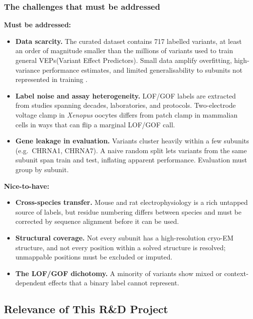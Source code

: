 \documentclass[rnd]{mas_proposal}
\begin{document}
\subsubsection{The challenges that must be addressed}
\textbf{Must be addressed:}
\begin{itemize}
    \item \textbf{Data scarcity.} The curated dataset contains 717 labelled
    variants, at least an order of magnitude smaller than the millions of
    variants used to train general VEPs(Variant Effect Predictors). Small data amplify overfitting,
    high-variance performance estimates, and limited generalisability to
    subunits not represented in training \cite{cadd,alphamissense}.
    \item \textbf{Label noise and assay heterogeneity.} LOF/GOF labels are
    extracted from studies spanning decades, laboratories, and protocols.
    Two-electrode voltage clamp in \emph{Xenopus} oocytes differs from patch
    clamp in mammalian cells in ways that can flip a marginal LOF/GOF call.
    \item \textbf{Gene leakage in evaluation.} Variants cluster heavily within
    a few subunits (e.g.\ CHRNA1, CHRNA7). A naive random split lets variants
    from the same subunit span train and test, inflating apparent performance.
    Evaluation must group by subunit.
\end{itemize}
\textbf{Nice-to-have:}
\begin{itemize}
    \item \textbf{Cross-species transfer.} Mouse and rat electrophysiology is a
    rich untapped source of labels, but residue numbering differs between
    species and must be corrected by sequence alignment before it can be used.
    \item \textbf{Structural coverage.} Not every subunit has a high-resolution
    cryo-EM structure, and not every position within a solved structure is
    resolved; unmappable positions must be excluded or imputed.
    \item \textbf{The LOF/GOF dichotomy.} A minority of variants show mixed or
    context-dependent effects that a binary label cannot represent.
\end{itemize}

\subsection{Relevance of This R\&D Project}
\end{document}
